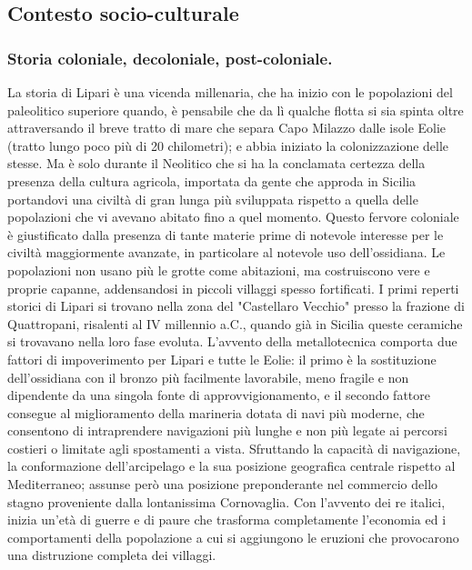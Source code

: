 \documentclass[fleqn,10pt]{SelfArx} %
\begin{document}
\subsection{Contesto socio-culturale}
\subsubsection{Storia coloniale, decoloniale, post-coloniale.}
La storia di Lipari è una vicenda millenaria, che ha inizio con le popolazioni del paleolitico superiore quando, è pensabile che da lì qualche flotta si sia spinta oltre attraversando il breve tratto di mare che separa Capo Milazzo dalle isole Eolie (tratto lungo poco più di 20 chilometri); e abbia iniziato la colonizzazione delle stesse. 
Ma è solo durante il Neolitico che si ha la conclamata certezza della presenza della cultura agricola, importata da gente che approda in Sicilia portandovi una civiltà di gran lunga più sviluppata rispetto  a quella delle popolazioni che vi avevano abitato fino a quel momento.  
Questo fervore coloniale è giustificato dalla presenza di tante materie prime di notevole interesse per le civiltà maggiormente avanzate, in particolare al notevole uso dell'ossidiana. 
Le popolazioni non usano più le grotte come abitazioni, ma costruiscono vere e proprie capanne, addensandosi in piccoli villaggi spesso fortificati. 
I primi reperti storici di Lipari si trovano nella zona del "Castellaro Vecchio" presso la frazione di Quattropani, risalenti al IV millennio a.C., quando già in Sicilia queste ceramiche si trovavano nella loro fase evoluta.                                           
L'avvento della metallotecnica comporta due fattori di impoverimento per Lipari e tutte le Eolie: il primo è la sostituzione dell'ossidiana con il bronzo più facilmente lavorabile, meno fragile e non dipendente da una singola fonte di approvvigionamento, e il secondo fattore consegue al miglioramento della marineria dotata di navi più moderne, che consentono di intraprendere navigazioni più lunghe e non più legate ai percorsi costieri o limitate agli spostamenti a vista. 
Sfruttando la capacità di navigazione, la conformazione dell'arcipelago e la sua posizione geografica centrale rispetto al Mediterraneo; assunse però una posizione preponderante nel commercio dello stagno proveniente dalla lontanissima Cornovaglia. 
Con l'avvento dei re italici, inizia un'età di guerre e di paure che trasforma completamente l'economia ed i comportamenti della popolazione a cui si aggiungono le eruzioni che provocarono una distruzione completa dei villaggi. 
\end{document}
